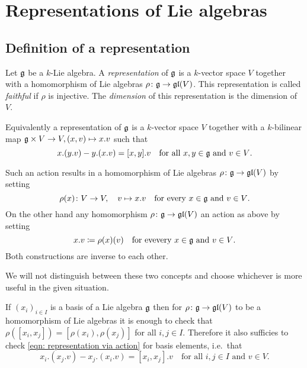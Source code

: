 \section{Representations of Lie algebras}





\subsection{Definition of a representation}


\begin{defi}
 Let $\mathfrak{g}$ be a $k$-Lie algebra. A \emph{representation} of $\mathfrak{g}$ is a $k$-vector space $V$ together with a homomorphism of Lie algebras $\rho \colon \mathfrak{g} \to \mathfrak{gl}(V)$. This representation is called \emph{faithful} if $\rho$ is injective. The \emph{dimension} of this representation is the dimension of $V$.
\end{defi}


\begin{rem}
 Equivalently a representation of $\mathfrak{g}$ is a $k$-vector space $V$ together with a $k$-bilinear map $\mathfrak{g} \times V \to V, (x,v) \mapsto x.v$ such that
 \begin{equation}\label{eqn: representation via action}
  x.(y.v) - y.(x.v) = [x,y].v \quad \text{for all $x,y \in \mathfrak{g}$ and $v \in V$}.
 \end{equation}
 
 Such an action results in a homomorphism of Lie algebras $\rho \colon \mathfrak{g} \to \mathfrak{gl}(V)$ by setting
 \[
  \rho(x) \colon V \to V, \quad v \mapsto x.v
  \quad \text{for every $x \in \mathfrak{g}$ and $v \in V$}.
 \]
 On the other hand any homomorphism $\rho \colon \mathfrak{g} \to \mathfrak{gl}(V)$ an action as above by setting
 \[
  x.v \coloneqq \rho(x)(v) \quad \text{for evevery $x \in \mathfrak{g}$ and $v \in V$}.
 \]
 Both constructions are inverse to each other.

 We will not distinguish between these two concepts and choose whichever is more useful in the given situation.
\end{rem}


\begin{rem}
 If $(x_i)_{i \in I}$ is a basis of a Lie algebra $\mathfrak{g}$ then for $\rho \colon \mathfrak{g} \to \mathfrak{gl}(V)$ to be a homomorphism of Lie algebras it is enough to check that $\rho([x_i,x_j])= [\rho(x_i), \rho(x_j)]$ for all $i,j \in I$. Therefore it also sufficies to check \eqref{eqn: representation via action} for basis elements, i.e.\ that
 \[
  x_i.(x_j.v) - x_j.(x_i.v) = [x_i, x_j].v \quad \text{for all $i,j \in I$ and $v \in V$}.
 \]
\end{rem}


